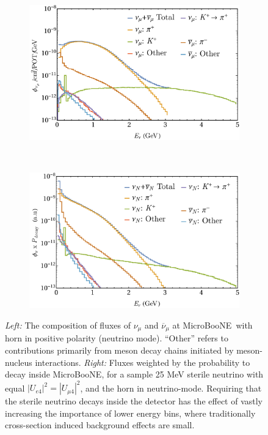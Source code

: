 \documentclass[11pt, a4paper]{article}
\def\muboone{MicroBooNE}
\begin{document}
\begin{figure}[t]
\center
\begin{subfigure}[t]{0.5\textwidth}
\includegraphics[width=\textwidth]{figures/microBooNE_flux.pdf} 
\end{subfigure}%
~
\begin{subfigure}[t]{0.5\textwidth}
\includegraphics[width=\textwidth]{figures/microBooNE_flux_weighted.pdf}
\end{subfigure}

\caption{\label{fig:flux_plots} \emph{Left:} The composition of fluxes of $\nu_\mu$
and $\overline{\nu}_\mu$ at \muboone\ with horn in positive polarity (neutrino
mode). ``Other'' refers to contributions primarily from meson decay chains
initiated by meson-nucleus interactions.\emph{ Right:} Fluxes weighted by the
probability to decay inside \muboone, for a sample 25 MeV sterile neutrino with equal
$|U_{e4}|^2 = |U_{\mu 4}|^2$, and the horn in neutrino-mode. Requiring that the
sterile neutrino decays inside the detector has the effect of vastly increasing the importance of lower
energy bins, where traditionally cross-section induced background effects are
small.}

\end{figure}
\end{document}

